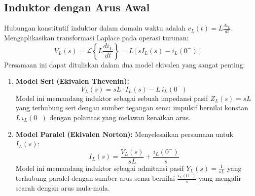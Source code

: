 \documentclass[11pt,a4paper]{article}
\theoremstyle{definition}
\begin{document}
\subsection{Induktor dengan Arus Awal}
Hubungan konstitutif induktor dalam domain waktu adalah $v_L(t) = L \frac{di_L}{dt}$. Mengaplikasikan transformasi Laplace pada operasi turunan:
\begin{equation}
    V_L(s) = \mathcal{L}\left\{ L \frac{di_L}{dt} \right\} = L \left[ s I_L(s) - i_L(0^-) \right]
\end{equation}
Persamaan ini dapat dituliskan dalam dua model ekivalen yang sangat penting:
\begin{enumerate}[leftmargin=*]
    \item \textbf{Model Seri (Ekivalen Thevenin):}
    \begin{equation}
        V_L(s) = sL \cdot I_L(s) - L \, i_L(0^-)
        \label{eq:inductor_thevenin}
    \end{equation}
    Model ini memandang induktor sebagai sebuah impedansi pasif $Z_L(s) = sL$ yang terhubung seri dengan sumber tegangan semu impulsif bernilai konstan $L \, i_L(0^-)$ dengan polaritas yang melawan kenaikan arus.
    \item \textbf{Model Paralel (Ekivalen Norton):}
    Menyelesaikan persamaan untuk $I_L(s)$:
    \begin{equation}
        I_L(s) = \frac{V_L(s)}{sL} + \frac{i_L(0^-)}{s}
        \label{eq:inductor_norton}
    \end{equation}
    Model ini memandang induktor sebagai admitansi pasif $Y_L(s) = \frac{1}{sL}$ yang terhubung paralel dengan sumber arus semu bernilai $\frac{i_L(0^-)}{s}$ yang mengalir searah dengan arus mula-mula.
\end{enumerate}
\end{document}
